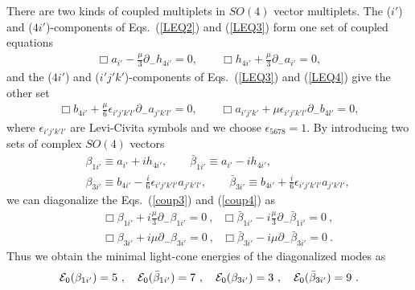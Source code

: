\documentclass[a4paper,12pt]{article}
\numberwithin{equation}{section}
\begin{document}
There are two kinds of coupled multiplets in $SO(4)$ vector
multiplets. The ($i'$) and ($4i'$)-components of Eqs.~(\ref{LEQ2}) and
(\ref{LEQ3}) form one set of coupled equations
\begin{eqnarray}
\Box a_{i'} - \frac{\mu}3 \partial_- h_{4i'} = 0, \qquad   \Box
h_{4i'} + \frac{\mu}3 \partial_- a_{i'} = 0, \label{coup3}
\end{eqnarray}
and the ($4i'$) and ($i'j'k'$)-components of Eqs.~(\ref{LEQ3}) and
(\ref{LEQ4}) give the other set
\begin{eqnarray}
 \Box b_{4i'} + \frac{\mu}6 \epsilon_{i'j'k'l'}
                \partial_- a_{j'k'l'} = 0,
\qquad \Box a_{i'j'k'} + \mu \epsilon_{i'j'k'l'}
                  \partial_- b_{4l'} = 0,
\label{coup4}
\end{eqnarray}
where $\epsilon_{i'j'k'l'}$ are Levi-Civita symbols and we choose
$\epsilon_{5678} = 1$.  By introducing two sets of complex $SO(4)$
vectors
\begin{eqnarray}
&&\beta_{1i'} \equiv a_{i'} +  i h_{4i'},\qquad \bar\beta_{1i'}
\equiv a_{i'} - i h_{4i'},
\label{mod3} \\
&& \beta_{3i'} \equiv b_{4i'}
                    - \frac{i}6 \epsilon_{i'j'k'l'} a_{j'k'l'},
\qquad \bar \beta_{3i'} \equiv b_{4i'}
                    + \frac{i}6 \epsilon_{i'j'k'l'} a_{j'k'l'},
\label{mod4}
\end{eqnarray}
we can diagonalize the Eqs.~(\ref{coup3}) and (\ref{coup4}) as
\begin{eqnarray}
&&\Box \beta_{1i'}
     + i \frac{\mu}{3} \partial_- \beta_{1i'} = 0 ~,~~~
  \Box \bar\beta_{1i'}
     - i \frac{\mu}{3} \partial_- \bar\beta_{1i'} = 0 ~,
\label{dia3} \\
&&\Box \beta_{3i'} + i \mu \partial_- \beta_{3i'} = 0 ~,~~~
  \Box \bar \beta_{3i'} - i \mu \partial_- \bar\beta_{3i'} = 0 ~.
\label{dia4}
\end{eqnarray}
Thus we obtain the minimal light-cone energies of the diagonalized
modes as
\begin{equation}\label{eng3}
{\cal E}_0 (\beta_{1i'}) = 5 ~,~~~
{\cal E}_0 (\bar\beta_{1i'}) = 7 ~,~~~
{\cal E}_0 (\beta_{3i'}) = 3 ~,~~~
{\cal E}_0 (\bar\beta_{3i'}) = 9 ~.
\end{equation}
\end{document}
